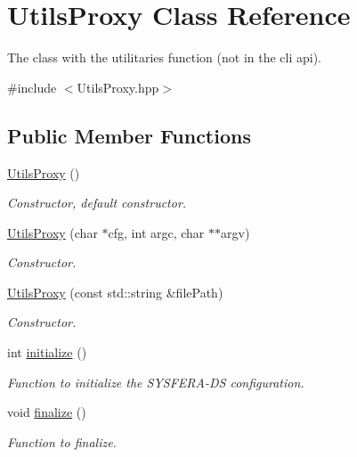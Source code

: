 \hypertarget{classUtilsProxy}{
\section{UtilsProxy Class Reference}
\label{classUtilsProxy}
}


The class with the utilitaries function (not in the cli api).  




{\ttfamily \#include $<$UtilsProxy.hpp$>$}

\subsection*{Public Member Functions}
\begin{DoxyCompactItemize}
\item 
\hypertarget{classUtilsProxy_aaafa5c4ab604c906d313bbeb86fae89d}{
\hyperlink{classUtilsProxy_aaafa5c4ab604c906d313bbeb86fae89d}{UtilsProxy} ()}
\label{classUtilsProxy_aaafa5c4ab604c906d313bbeb86fae89d}

\begin{DoxyCompactList}\small\item\em Constructor, default constructor. \item\end{DoxyCompactList}\item 
\hyperlink{classUtilsProxy_ac5a9f462a23dca72804c9949de07dfb3}{UtilsProxy} (char $\ast$cfg, int argc, char $\ast$$\ast$argv)
\begin{DoxyCompactList}\small\item\em Constructor. \item\end{DoxyCompactList}\item 
\hyperlink{classUtilsProxy_afc7b1c01f7d1129e80d1fe63da23c39c}{UtilsProxy} (const std::string \&filePath)
\begin{DoxyCompactList}\small\item\em Constructor. \item\end{DoxyCompactList}\item 
int \hyperlink{classUtilsProxy_a037ff9b798890eb865cddef7dd9eec94}{initialize} ()
\begin{DoxyCompactList}\small\item\em Function to initialize the SYSFERA-\/DS configuration. \item\end{DoxyCompactList}\item 
void \hyperlink{classUtilsProxy_a2dbe3b111c081b7acf07fcd3e7ee1353}{finalize} ()
\begin{DoxyCompactList}\small\item\em Function to finalize. \item\end{DoxyCompactList}\end{DoxyCompactItemize}
